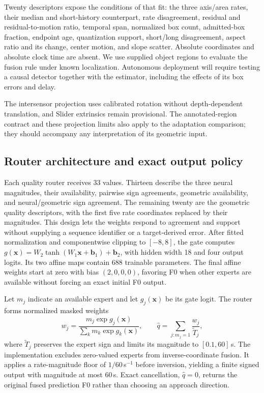 Twenty descriptors expose the conditions of that fit: the three axis/area rates, their median and short-history counterpart, rate disagreement, residual and residual-to-motion ratio, temporal span, normalized box count, admitted-box fraction, endpoint age, quantization support, short/long disagreement, aspect ratio and its change, center motion, and slope scatter. Absolute coordinates and absolute clock time are absent. We use supplied object regions to evaluate the fusion rule under known localization. Autonomous deployment will require testing a causal detector together with the estimator, including the effects of its box errors and delay.

The intersensor projection uses calibrated rotation without depth-dependent translation, and Slider extrinsics remain provisional. The annotated-region contract and these projection limits also apply to the adaptation comparison; they should accompany any interpretation of its geometric input. 

\subsection{Router architecture and exact output policy}
Each quality router receives 33 values. Thirteen describe the three neural magnitudes, their availability, pairwise sign agreements, geometric availability, and neural/geometric sign agreement. The remaining twenty are the geometric quality descriptors, with the first five rate coordinates replaced by their magnitudes. This design lets the weights respond to agreement and support without supplying a sequence identifier or a target-derived error. After fitted normalization and componentwise clipping to $[-8,8]$, the gate computes $g(\mathbf x)=W_2\tanh(W_1\mathbf x+\mathbf b_1)+\mathbf b_2$, with hidden width 18 and four output logits. Its two affine maps contain 688 trainable parameters. The final affine weights start at zero with bias $(2,0,0,0)$, favoring F0 when other experts are available without forcing an exact initial F0 output. 

Let $m_j$ indicate an available expert and let $g_j(\mathbf x)$ be its gate logit. The router forms normalized masked weights
\begin{equation}
 w_j=\frac{m_j\exp g_j(\mathbf x)}{\sum_k m_k\exp g_k(\mathbf x)},
 \qquad \widehat q=\sum_{j:m_j=1}\frac{w_j}{\widetilde T_j},
 \label{eq:adapt-inverse-fusion}
\end{equation}
where $\widetilde T_j$ preserves the expert sign and limits its magnitude to $[0.1,60]$\,s. The implementation excludes zero-valued experts from inverse-coordinate fusion. It applies a rate-magnitude floor of $1/60$\,s$^{-1}$ before inversion, yielding a finite signed output with magnitude at most 60\,s. Exact cancellation, $\widehat q=0$, returns the original fused prediction F0 rather than choosing an approach direction.

